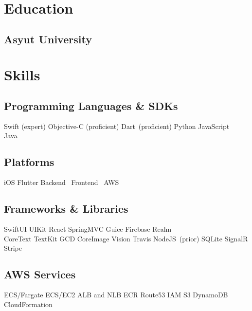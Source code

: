 \documentclass[]{deedy-resume-openfont}
\begin{document}
\hfill
\begin{minipage}[t]{1\textwidth} 

\section{Education} 

\subsection{Asyut University}
\sectionsep


\section{Skills}
\subsection{Programming Languages \& SDKs}
Swift (expert) \textbullet{} Objective-C (proficient) \textbullet{} Dart\ (proficient) \textbullet{} Python \textbullet{} JavaScript\ \textbullet{} Java\
\sectionsep
\subsection{Platforms}
iOS \textbullet{} Flutter \textbullet{} Backend\ \textbullet{} Frontend\ \textbullet{} AWS\
\sectionsep
\subsection{Frameworks \& Libraries}
SwiftUI \textbullet{} UIKit \textbullet{} React \textbullet{} SpringMVC \textbullet{} Guice \textbullet{}
Firebase \textbullet{} Realm \textbullet{} \\CoreText \textbullet{} TextKit \textbullet{} GCD \textbullet{} CoreImage \textbullet{} Vision \textbullet{} Travis \textbullet{} NodeJS\ (prior) \textbullet{} SQLite \textbullet{} SignalR \textbullet{} Stripe
\sectionsep
\subsection{AWS Services}
ECS/Fargate \textbullet{} ECS/EC2 \textbullet{} ALB and NLB \textbullet{} ECR \textbullet{} Route53 \textbullet{} IAM \textbullet{} S3 \textbullet{} DynamoDB \textbullet{} CloudFormation
\sectionsep

\end{minipage}
\end{document}
